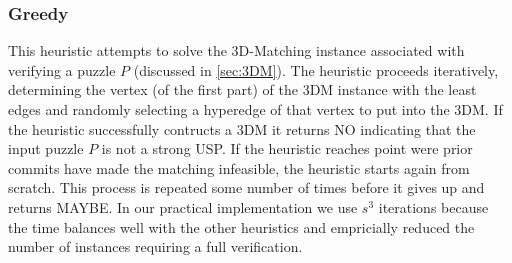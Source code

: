 \documentclass[11pt]{article}
\begin{document}



\subsubsection{Greedy}

This heuristic attempts to solve the 3D-Matching instance associated
with verifying a puzzle $P$ (discussed in \autoref{sec:3DM}).  The
heuristic proceeds iteratively, determining the vertex (of the first part) of the 3DM
instance with the least edges and randomly selecting a hyperedge of that vertex to put into the 3DM.  If the heuristic successfully contructs a
3DM it returns NO indicating that the input puzzle $P$ is not a strong
USP.  If the heuristic reaches point were prior commits have made the
matching infeasible, the heuristic starts again from scratch.  This
process is repeated some number of times before it gives up and
returns MAYBE.  In our practical implementation we use $s^3$
iterations because the time balances well with the other heuristics
and empricially reduced the number of instances requiring a full
verification.
\end{document}
